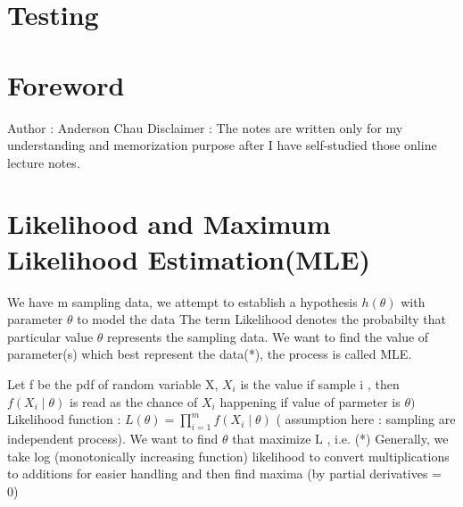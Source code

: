 \documentclass{article}
\begin{document}
\section{Testing}


\section{Foreword}
Author : Anderson Chau
\newline 
\newline 
Disclaimer : The notes are written only for my understanding and memorization purpose after I have self-studied those online lecture notes. 


\section{Likelihood and Maximum Likelihood Estimation(MLE)}
We have m sampling data, we attempt to establish a hypothesis \(h(\theta)\) with parameter \(\theta\) to model the data \newline
The term Likelihood denotes the probabilty that particular value \(\theta\) represents the sampling data.\newline 
We want to find the value of parameter(s) which best represent the data(*), the process is called MLE. \newline 

Let f be the pdf of random variable X, \(X_i\) is the value if sample i ,  then \(f(X_i \mid \theta)\) is read as the chance of \(X_i\) happening if value of parmeter is \(\theta)\) \newline  \newline 
Likelihood function : \(L(\theta) = \prod_{i=1}^{m} f(X_i \mid \theta)\) ( assumption here : sampling are independent process). We want to find \(\theta\) that maximize  L , i.e. (*) \newline
Generally, we take log (monotonically increasing function) likelihood to convert multiplications to additions for easier handling  and then find maxima (by partial derivatives = 0) 
\end{document}
